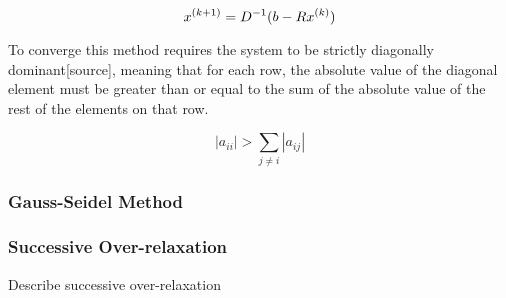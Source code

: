 $$x^{(k+1)} = {D}^{-1}(b - Rx^{(k)})$$

To converge this method requires the system to be strictly diagonally dominant[source],
meaning that for each row, the absolute value of the diagonal element must be
greater than or equal to the sum of the absolute value of the rest of the
elements on that row.

$$|a_{ii}| > \sum_{j \neq i} |a_{ij}|$$

\subsubsection*{Gauss-Seidel Method}



\subsubsection*{Successive Over-relaxation}

Describe successive over-relaxation
